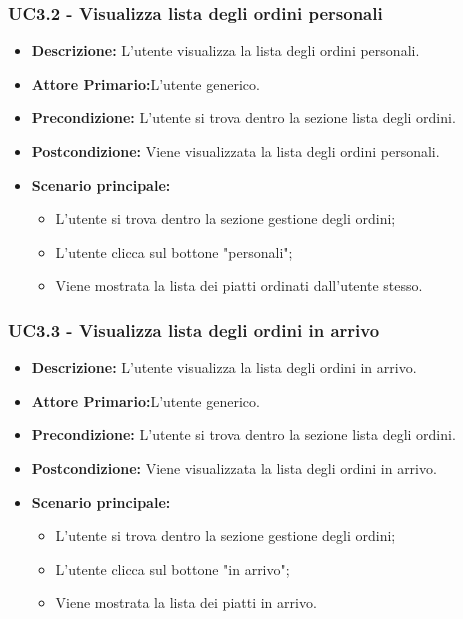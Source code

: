 \subsubsection{UC3.2 - Visualizza lista degli ordini personali}
\begin{itemize}
    \item \textbf{Descrizione:} L'utente visualizza la lista degli ordini personali.
    \item \textbf{Attore Primario:}L'utente generico.
    \item \textbf{Precondizione:} L'utente si trova dentro la sezione lista degli ordini.
    \item \textbf{Postcondizione:} Viene visualizzata la lista degli ordini personali.
    \item \textbf{Scenario principale:}
    \begin{itemize}
        \item L'utente si trova dentro la sezione gestione degli ordini;
        \item L'utente clicca sul bottone "personali";
        \item Viene mostrata la lista dei piatti ordinati dall'utente stesso.
    \end{itemize}
\end{itemize}
\subsubsection{UC3.3 - Visualizza lista degli ordini in arrivo}
\begin{itemize}
    \item \textbf{Descrizione:} L'utente visualizza la lista degli ordini in arrivo.
    \item \textbf{Attore Primario:}L'utente generico.
    \item \textbf{Precondizione:} L'utente si trova dentro la sezione lista degli ordini.
    \item \textbf{Postcondizione:} Viene visualizzata la lista degli ordini in arrivo.
    \item \textbf{Scenario principale:}
    \begin{itemize}
        \item L'utente si trova dentro la sezione gestione degli ordini;
        \item L'utente clicca sul bottone "in arrivo";
        \item Viene mostrata la lista dei piatti in arrivo.
    \end{itemize}
\end{itemize}
